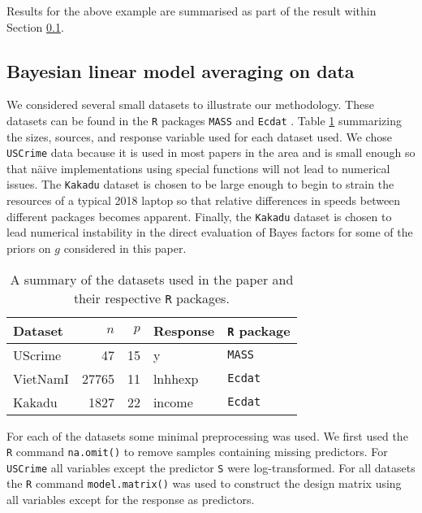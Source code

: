 \noindent Results for the above example are summarised as part of the result
within Section \ref{sec:BLMA}.

\subsection{Bayesian linear model averaging on data}\label{sec:BLMA}

We considered several small datasets to illustrate our methodology. These
datasets can be found in the {\tt R} packages {\tt MASS} \citep{Venables2002}
and {\tt Ecdat} \citep{Croissant2016}. Table \ref{tab:g_prior_datasets}
summarizing the sizes,  sources, and response variable used for each dataset
used.  We chose {\tt USCrime} data because it is used in most papers in the
area and is small enough so that n\"aive implementations using special
functions will not lead to numerical issues. The 
{\tt Kakadu} dataset is chosen to be large enough to begin to strain the
resources of a typical 2018 laptop so that relative differences in speeds
between different packages becomes apparent. Finally, the {\tt Kakadu} dataset
is chosen to lead numerical instability in the direct evaluation of Bayes
factors for some of the priors on $g$ considered in this paper.

\begin{table}[h]
	\begin{center}
		\begin{tabular}{l|r|r|l|l}
			Dataset	& $n$ & $p$ & Response & {\tt R} package \\ 
			\hline 
			UScrime 	& 47 & 15 & y & {\tt MASS} \\  
			VietNamI	& 27765 & 11 & lnhhexp & {\tt Ecdat}  \\ 
			Kakadu	& 1827 & 22 & income & {\tt Ecdat}   \\  
		\end{tabular} 
	\end{center}\bigskip 
	\caption{A summary of the datasets used in the paper and their respective {\tt R} packages.}
	\label{tab:g_prior_datasets}
\end{table}

For each of the datasets some minimal preprocessing was used.  We first used
the {\tt R} command {\tt na.omit()} to remove samples containing missing
predictors.  For {\tt USCrime} all variables except the predictor {\tt S} were
log-transformed. For all datasets the {\tt R} command {\tt model.matrix()} was
used to construct the design matrix using all variables except for the response
as predictors.

